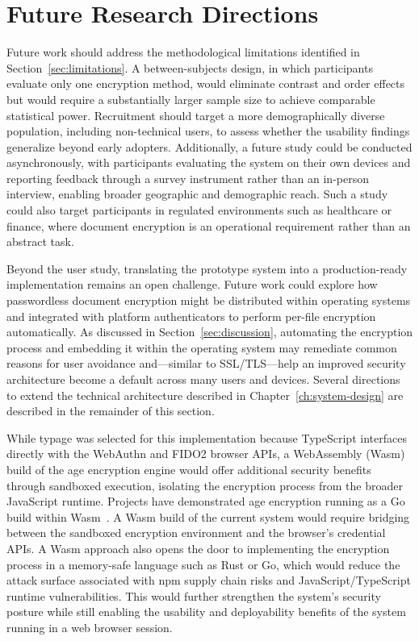 \section{Future Research Directions}
\label{sec:future-work}

Future work should address the methodological limitations identified in Section~\ref{sec:limitations}. A between-subjects design, in which participants evaluate only one encryption method, would eliminate contrast and order effects but would require a substantially larger sample size to achieve comparable statistical power. Recruitment should target a more demographically diverse population, including non-technical users, to assess whether the usability findings generalize beyond early adopters. Additionally, a future study could be conducted asynchronously, with participants evaluating the system on their own devices and reporting feedback through a survey instrument rather than an in-person interview, enabling broader geographic and demographic reach. Such a study could also target participants in regulated environments such as healthcare or finance, where document encryption is an operational requirement rather than an abstract task.

Beyond the user study, translating the prototype system into a production-ready implementation remains an open challenge. Future work could explore how passwordless document encryption might be distributed within operating systems and integrated with platform authenticators to perform per-file encryption automatically. As discussed in Section~\ref{sec:discussion}, automating the encryption process and embedding it within the operating system may remediate common reasons for user avoidance and---similar to SSL/TLS---help an improved security architecture become a default across many users and devices. Several directions to extend the technical architecture described in Chapter~\ref{ch:system-design} are described in the remainder of this section.

While typage was selected for this implementation because TypeScript interfaces directly with the WebAuthn and FIDO2 browser APIs, a WebAssembly (Wasm) build of the age encryption engine would offer additional security benefits through sandboxed execution, isolating the encryption process from the broader JavaScript runtime. Projects have demonstrated age encryption running as a Go build within Wasm~\cite{age_wasm}. A Wasm build of the current system would require bridging between the sandboxed encryption environment and the browser's credential APIs. A Wasm approach also opens the door to implementing the encryption process in a memory-safe language such as Rust or Go, which would reduce the attack surface associated with npm supply chain risks and JavaScript/TypeScript runtime vulnerabilities. This would further strengthen the system's security posture while still enabling the usability and deployability benefits of the system running in a web browser session.

